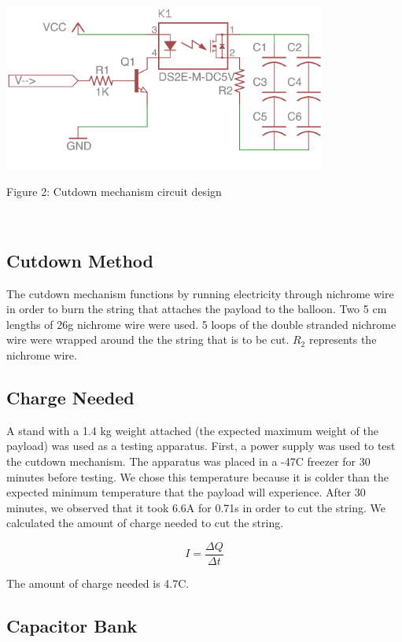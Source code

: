 \documentclass[12pt,]{article}
\begin{document}
\begin{center}\includegraphics[width=400px]{assets/cutdown} \end{center}

Figure 2: Cutdown mechanism circuit design

~

\subsection{Cutdown Method}\label{cutdown-method}

The cutdown mechanism functions by running electricity through nichrome
wire in order to burn the string that attaches the payload to the
balloon. Two 5 cm lengths of 26g nichrome wire were used. 5 loops of the
double stranded nichrome wire were wrapped around the the string that is
to be cut. \(R_{2}\) represents the nichrome wire.

\subsection{Charge Needed}\label{charge-needed}

A stand with a 1.4 kg weight attached (the expected maximum weight of
the payload) was used as a testing apparatus. First, a power supply was
used to test the cutdown mechanism. The apparatus was placed in a
-47\degree C freezer for 30 minutes before testing. We chose this
temperature because it is colder than the expected minimum temperature
that the payload will experience. After 30 minutes, we observed that it
took 6.6A for 0.71s in order to cut the string. We calculated the amount
of charge needed to cut the string.

\[I=\frac{\Delta Q}{\Delta t}\]

The amount of charge needed is 4.7C.

\subsection{Capacitor Bank}\label{capacitor-bank}
\end{document}
